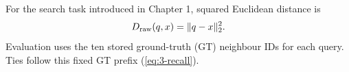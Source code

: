 For the search task introduced in Chapter 1, squared Euclidean distance is
\begin{equation}
 D_{\mathrm{raw}}(q,x)=\|q-x\|_2^2.
 \label{eq:2-raw}
\end{equation}
Evaluation uses the ten stored ground-truth (GT) neighbour IDs for each
query. Ties follow this fixed GT prefix (\cref{eq:3-recall}).

